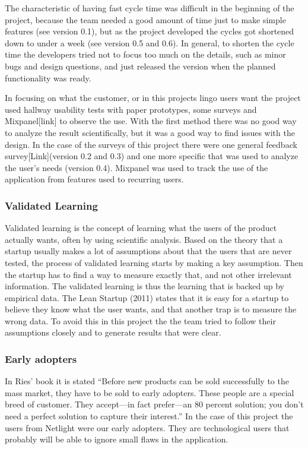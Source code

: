 The characteristic of having fast cycle time was difficult in the beginning of the project, because the team needed a good amount of time just to make simple features (see version 0.1), but as the project developed the cycles got shortened down to under a week (see version 0.5 and 0.6). In general, to shorten the cycle time the developers tried not to focus too much on the details, such as minor bugs and design questions, and just released the version when the planned functionality was ready. 

In focusing on what the customer, or in this projects lingo users want the project used hallway usability tests with paper prototypes, some surveys and Mixpanel[link] to observe the use. With the first method there was no good way to analyze the result scientifically, but it was a good way to find issues with the design. In the case of the surveys of this project there were one general feedback survey[Link](version 0.2 and 0.3) and one more specific that was used to analyze the user’s needs (version 0.4). Mixpanel was used to track the use of the application from features used to recurring users.

\subsubsection{Validated Learning}                 
Validated learning is the concept of learning what the users of the product actually wants, often by using scientific analysis. Based on the theory that a startup usually makes a lot of assumptions about that the users that are never tested, the process of validated learning starts by making a key assumption. Then the startup has to find a way to measure exactly that, and not other irrelevant information. The validated learning is thus the learning that is backed up by empirical data. The Lean Startup (2011) states that it is easy for a startup to believe they know what the user wants, and that another trap is to measure the wrong data. \cite{lean-startup} To avoid this in this project the the team tried to follow their assumptions closely and to generate results that were clear. 
\subsubsection{Early adopters}      
In Ries’ book it is stated
“Before new products can be sold successfully to the mass market, they have to be sold to early adopters. These people are a special breed of customer. They accept—in fact prefer—an 80 percent solution; you don’t need a perfect solution to capture their interest.” \cite[p.~87]{lean-startup}
In the case of this project the users from Netlight were our early adopters. They are technological users that probably will be able to ignore small flaws in the application. 
                                    
